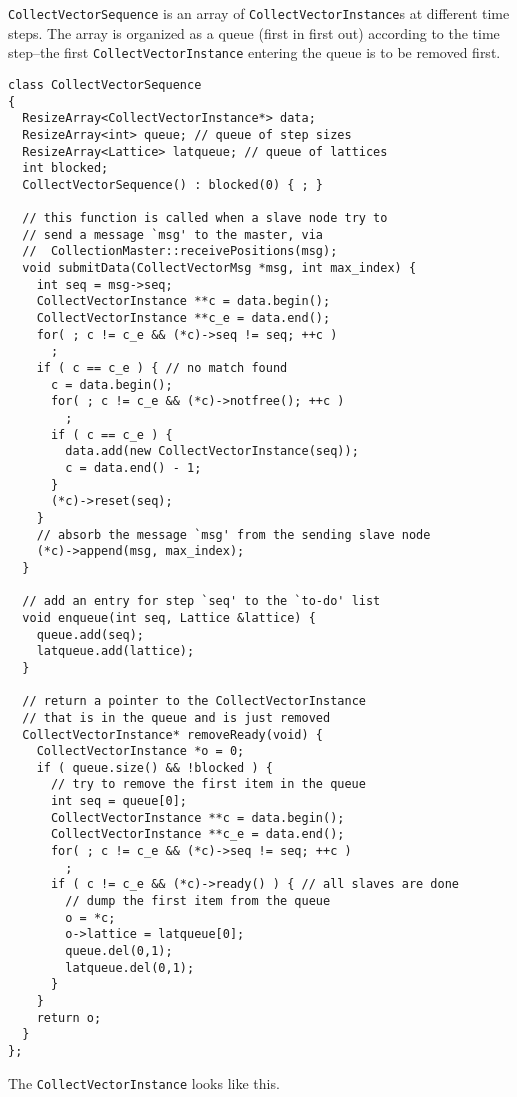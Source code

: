 \documentclass{article}
\begin{document}
\texttt{CollectVectorSequence} is an array
of \texttt{CollectVectorInstance}s at different time steps.
%
The array is organized as a queue (first in first out)
according to the time step--the first \texttt{CollectVectorInstance}
entering the queue is to be removed first.


\begin{lstlisting}
class CollectVectorSequence
{
  ResizeArray<CollectVectorInstance*> data;
  ResizeArray<int> queue; // queue of step sizes
  ResizeArray<Lattice> latqueue; // queue of lattices
  int blocked;
  CollectVectorSequence() : blocked(0) { ; }

  // this function is called when a slave node try to
  // send a message `msg' to the master, via
  //  CollectionMaster::receivePositions(msg);
  void submitData(CollectVectorMsg *msg, int max_index) {
    int seq = msg->seq;
    CollectVectorInstance **c = data.begin();
    CollectVectorInstance **c_e = data.end();
    for( ; c != c_e && (*c)->seq != seq; ++c )
      ;
    if ( c == c_e ) { // no match found
      c = data.begin();
      for( ; c != c_e && (*c)->notfree(); ++c )
        ;
      if ( c == c_e ) {
        data.add(new CollectVectorInstance(seq));
        c = data.end() - 1;
      }
      (*c)->reset(seq);
    }
    // absorb the message `msg' from the sending slave node
    (*c)->append(msg, max_index);
  }

  // add an entry for step `seq' to the `to-do' list
  void enqueue(int seq, Lattice &lattice) {
    queue.add(seq);
    latqueue.add(lattice);
  }

  // return a pointer to the CollectVectorInstance
  // that is in the queue and is just removed
  CollectVectorInstance* removeReady(void) {
    CollectVectorInstance *o = 0;
    if ( queue.size() && !blocked ) {
      // try to remove the first item in the queue
      int seq = queue[0];
      CollectVectorInstance **c = data.begin();
      CollectVectorInstance **c_e = data.end();
      for( ; c != c_e && (*c)->seq != seq; ++c )
        ;
      if ( c != c_e && (*c)->ready() ) { // all slaves are done
        // dump the first item from the queue
        o = *c;
        o->lattice = latqueue[0];
        queue.del(0,1);
        latqueue.del(0,1);
      }
    }
    return o;
  }
};

\end{lstlisting}





The \texttt{CollectVectorInstance} looks like this.
\end{document}
